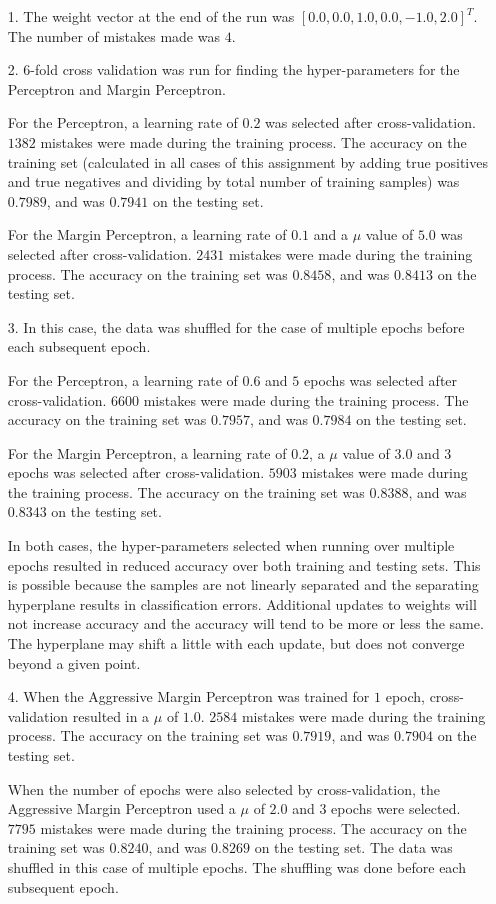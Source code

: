 \begin{enumerate}
\item[1.] The weight vector at the end of the run was $\left [0.0, 0.0, 1.0, 0.0, -1.0, 2.0 \right ] ^ T$. The number of mistakes made was $4$.
  
\item[2.] 6-fold cross validation was run for finding the hyper-parameters for the Perceptron and Margin Perceptron. 

For the Perceptron, a learning rate of $0.2$ was selected after cross-validation. $1382$ mistakes were made during the training process. The accuracy on the training set (calculated in all cases of this assignment by adding true positives and true negatives and dividing by total number of training samples) was $0.7989$, and was $0.7941$ on the testing set.

For the Margin Perceptron, a learning rate of $0.1$ and a $\mu$ value of $5.0$ was selected after cross-validation. $2431$ mistakes were made during the training process. The accuracy on the training set was $0.8458$, and was $0.8413$ on the testing set.

\item[3.] In this case, the data was shuffled for the case of multiple epochs before each subsequent epoch.

For the Perceptron, a learning rate of $0.6$ and $5$ epochs was selected after cross-validation. $6600$ mistakes were made during the training process. The accuracy on the training set was $0.7957$, and was $0.7984$ on the testing set.

For the Margin Perceptron, a learning rate of $0.2$, a $\mu$ value of $3.0$ and $3$ epochs was selected after cross-validation. $5903$ mistakes were made during the training process. The accuracy on the training set was $0.8388$, and was $0.8343$ on the testing set.

In both cases, the hyper-parameters selected when running over multiple epochs resulted in reduced accuracy over both training and testing sets. This is possible because the samples are not linearly separated and the separating hyperplane results in classification errors. Additional updates to weights will not increase accuracy and the accuracy will tend to be more or less the same. The hyperplane may shift a little with each update, but does not converge beyond a given point.

\item[4.] When the Aggressive Margin Perceptron was trained for $1$ epoch, cross-validation resulted in a $\mu$ of $1.0$. $2584$ mistakes were made during the training process. The accuracy on the training set was $0.7919$, and was $0.7904$ on the testing set.

When the number of epochs were also selected by cross-validation, the Aggressive Margin Perceptron used a $\mu$ of $2.0$ and $3$ epochs were selected. $7795$ mistakes were made during the training process. The accuracy on the training set was $0.8240$, and was $0.8269$ on the testing set. The data was shuffled in this case of multiple epochs. The shuffling was done before each subsequent epoch.


\end{enumerate}


